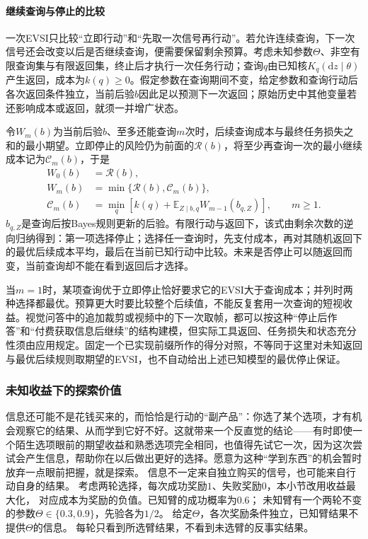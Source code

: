 \paragraph{继续查询与停止的比较}
一次EVSI只比较“立即行动”和“先取一次信号再行动”。若允许连续查询，下一次信号还会改变以后是否继续查询，便需要保留剩余预算。考虑未知参数\(\Theta\)、非空有限查询集与有限返回集，终止后才执行一次任务行动；查询\(q\)由已知核\(K_q(\mathrm dz\mid\theta)\)产生返回，成本为\(k(q)\geq0\)。假定参数在查询期间不变，给定参数和查询行动后各次返回条件独立，当前后验\(b\)因此足以预测下一次返回；原始历史中其他变量若还影响成本或返回，就须一并增广状态。

令\(W_m(b)\)为当前后验\(b\)、至多还能查询\(m\)次时，后续查询成本与最终任务损失之和的最小期望。立即停止的风险仍为前面的\(\mathcal R(b)\)，将至少再查询一次的最小继续成本记为\(\mathcal C_m(b)\)，于是
\begin{equation}
\begin{aligned}
 W_0(b)&=\mathcal R(b),\\
 W_m(b)&=\min\{\mathcal R(b),\mathcal C_m(b)\},\\
 \mathcal C_m(b)&=\min_q\left[k(q)+\mathbb E_{Z\mid b,q}
               W_{m-1}(b_{q,Z})\right],\qquad m\geq1.
 \label{eq:decision-query-stopping-bellman}
\end{aligned}
\end{equation}
\(b_{q,Z}\)是查询后按Bayes规则更新的后验。有限行动与返回下，该式由剩余次数的逆向归纳得到：第一项选择停止；选择任一查询时，先支付成本，再对其随机返回下的最优后续成本平均，最后在当前已知行动中比较。未来是否停止可以随返回而变，当前查询却不能在看到返回后才选择。

当\(m=1\)时，某项查询优于立即停止恰好要求它的EVSI大于查询成本；并列时两种选择都最优。预算更大时要比较整个后续值，不能反复套用一次查询的短视收益。视觉问答中的追加裁剪或视频中的下一次取帧，都可以按这种“停止后作答”和“付费获取信息后继续”的结构建模，但实际工具返回、任务损失和状态充分性须由应用规定。固定一个已实现前缀所作的得分对照，不等同于这里对未知返回与最优后续规则取期望的EVSI，也不自动给出上述已知模型的最优停止保证。

\subsubsection{未知收益下的探索价值}

信息还可能不是花钱买来的，而恰恰是行动的“副产品”：你选了某个选项，才有机会观察它的结果、从而学到它好不好。这就带来一个反直觉的结论——有时即使一个陌生选项眼前的期望收益和熟悉选项完全相同，也值得先试它一次，因为这次尝试会产生信息，帮助你在以后做出更好的选择。愿意为这种“学到东西”的机会暂时放弃一点眼前把握，就是探索。
信息不一定来自独立购买的信号，也可能来自行动自身的结果。
考虑两轮选择，每次成功奖励$1$、失败奖励$0$，本小节改用收益最大化，
对应成本为奖励的负值。已知臂的成功概率为$0.6$；
未知臂有一个两轮不变的参数$\Theta\in\{0.3,0.9\}$，先验各为$1/2$。
给定$\Theta$，各次奖励条件独立，已知臂结果不提供$\Theta$的信息。
每轮只看到所选臂结果，不看到未选臂的反事实结果。

